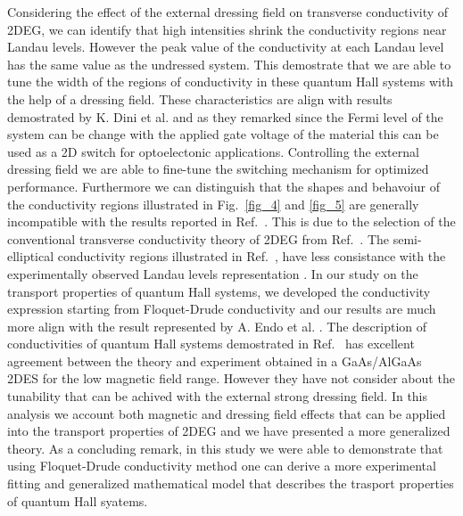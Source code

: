 Considering the effect of the external dressing field on transverse conductivity of 2DEG, we can identify that high intensities shrink the conductivity regions near Landau levels. However the peak value of the conductivity at each Landau level has the same value as the undressed system. This demostrate that we are able to tune the width of the regions of conductivity in these quantum Hall systems with the help of a dressing field.
These characteristics are align with results demostrated by K. Dini et al.\cite{dini16} and as they remarked since the Fermi level of the system can be change with the applied gate voltage of the material this can be used as a 2D switch for optoelectonic applications. Controlling  the external dressing field we are able to fine-tune the switching mechanism for optimized performance.
Furthermore we can distinguish that the shapes and behavoiur of the conductivity regions illustrated in Fig.~\ref{fig_4} and \ref{fig_5} are generally incompatible with the results reported in Ref.~\cite{dini16}. This is due to the selection of the conventional transverse conductivity theory of 2DEG from Ref.~\cite{ando74,ando82}. The semi-elliptical conductivity regions illustrated in Ref.~\cite{dini16,ando74,ando82}, have less consistance with the experimentally observed Landau levels representation \cite{endo09}.
In our study on the transport properties of quantum Hall systems, we developed the conductivity expression starting from Floquet-Drude conductivity \cite{wackerl20} and our results are much more align with the result represented by A. Endo et al. \cite{endo09}.
The description of conductivities of quantum Hall systems demostrated in Ref.~\cite{endo09} has excellent agreement between the theory and experiment obtained in a GaAs/AlGaAs 2DES for the low magnetic field range. However they have not consider about the tunability that can be achived with the external strong dressing field. In this analysis we account both magnetic and dressing field effects that can be applied into the transport properties of 2DEG and we have presented a more generalized theory. As a concluding remark, in this study we were able to demonstrate that using Floquet-Drude conductivity method one can derive a more experimental fitting and generalized mathematical model that describes the trasport properties of quantum Hall syatems.

